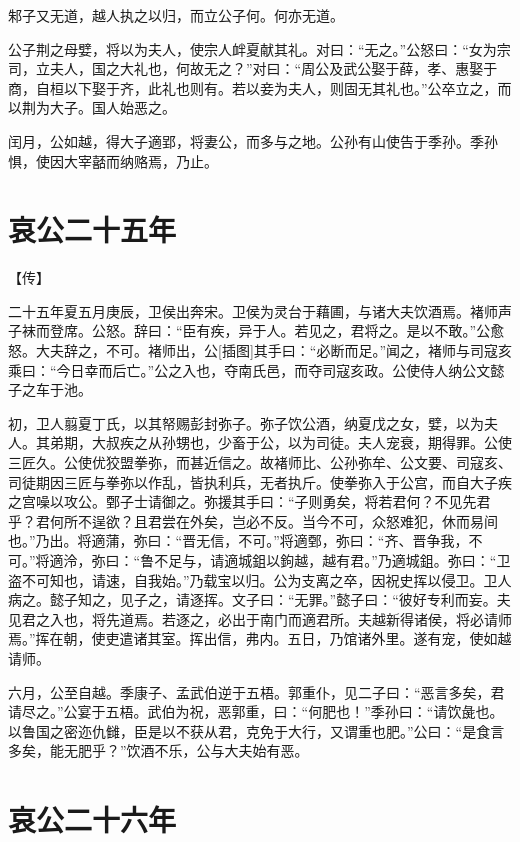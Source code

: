 \documentclass[a4paper,12pt,UTF8,twoside]{ctexbook}
\begin{document}
邾子又无道，越人执之以归，而立公子何。何亦无道。

公子荆之母嬖，将以为夫人，使宗人衅夏献其礼。对曰：“无之。”公怒曰：“女为宗司，立夫人，国之大礼也，何故无之？”对曰：“周公及武公娶于薛，孝、惠娶于商，自桓以下娶于齐，此礼也则有。若以妾为夫人，则固无其礼也。”公卒立之，而以荆为大子。国人始恶之。

闰月，公如越，得大子適郢，将妻公，而多与之地。公孙有山使告于季孙。季孙惧，使因大宰嚭而纳赂焉，乃止。


\section{哀公二十五年}


【传】

二十五年夏五月庚辰，卫侯出奔宋。卫侯为灵台于藉圃，与诸大夫饮酒焉。褚师声子袜而登席。公怒。辞曰：“臣有疾，异于人。若见之，君将之。是以不敢。”公愈怒。大夫辞之，不可。褚师出，公[插图]其手曰：“必断而足。”闻之，褚师与司寇亥乘曰：“今日幸而后亡。”公之入也，夺南氏邑，而夺司寇亥政。公使侍人纳公文懿子之车于池。

初，卫人翦夏丁氏，以其帑赐彭封弥子。弥子饮公酒，纳夏戊之女，嬖，以为夫人。其弟期，大叔疾之从孙甥也，少畜于公，以为司徒。夫人宠衰，期得罪。公使三匠久。公使优狡盟拳弥，而甚近信之。故褚师比、公孙弥牟、公文要、司寇亥、司徒期因三匠与拳弥以作乱，皆执利兵，无者执斤。使拳弥入于公宫，而自大子疾之宫噪以攻公。鄄子士请御之。弥援其手曰：“子则勇矣，将若君何？不见先君乎？君何所不逞欲？且君尝在外矣，岂必不反。当今不可，众怒难犯，休而易间也。”乃出。将適蒲，弥曰：“晋无信，不可。”将適鄄，弥曰：“齐、晋争我，不可。”将適泠，弥曰：“鲁不足与，请適城鉏以鉤越，越有君。”乃適城鉏。弥曰：“卫盗不可知也，请速，自我始。”乃载宝以归。公为支离之卒，因祝史挥以侵卫。卫人病之。懿子知之，见子之，请逐挥。文子曰：“无罪。”懿子曰：“彼好专利而妄。夫见君之入也，将先道焉。若逐之，必出于南门而適君所。夫越新得诸侯，将必请师焉。”挥在朝，使吏遣诸其室。挥出信，弗内。五日，乃馆诸外里。遂有宠，使如越请师。

六月，公至自越。季康子、孟武伯逆于五梧。郭重仆，见二子曰：“恶言多矣，君请尽之。”公宴于五梧。武伯为祝，恶郭重，曰：“何肥也！”季孙曰：“请饮彘也。以鲁国之密迩仇雠，臣是以不获从君，克免于大行，又谓重也肥。”公曰：“是食言多矣，能无肥乎？”饮酒不乐，公与大夫始有恶。





\section{哀公二十六年}
\end{document}
